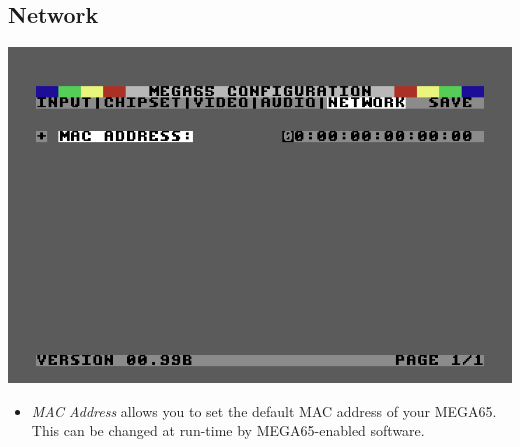 \subsection{Network}

\begin{center}
\includegraphics[width=0.7\linewidth]{images/ss-m65config-5.png}
\end{center}

\begin{itemize}
  \item{\em MAC Address} allows you to set the default MAC address of your MEGA65. This can be changed at run-time by MEGA65-enabled software.
\end{itemize}

